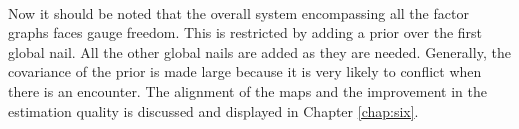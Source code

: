 \paragraph{}
Now it should be noted that the overall system encompassing all the factor graphs faces gauge freedom. This is restricted by adding a prior over the first global nail. All the other global nails are added as they are needed. Generally, the covariance of the prior is made large because it is very likely to conflict when there is an encounter. The alignment of the maps and the improvement in the estimation quality is discussed and displayed in Chapter \ref{chap:six}.
